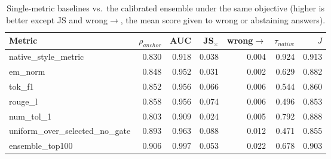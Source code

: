 \begin{table}[t]
\centering
\footnotesize
\caption{Single-metric baselines vs.\ the calibrated ensemble under the same objective (higher is better except JS and wrong$\to$, the mean score given to wrong or abstaining answers).}
\label{tab:baselines}

\begin{tabular}{lrrrrrr}
\toprule
Metric & $\rho_{anchor}$ & AUC & JS$_\times$ & wrong$\to$ & $\tau_{native}$ & $J$ \\
\midrule
native\_style\_metric & 0.830 & 0.918 & 0.038 & 0.004 & 0.924 & 0.913 \\
em\_norm & 0.848 & 0.952 & 0.031 & 0.002 & 0.629 & 0.882 \\
tok\_f1 & 0.852 & 0.956 & 0.066 & 0.006 & 0.544 & 0.860 \\
rouge\_l & 0.858 & 0.956 & 0.074 & 0.006 & 0.496 & 0.853 \\
num\_tol\_1 & 0.803 & 0.909 & 0.024 & 0.005 & 0.792 & 0.888 \\
uniform\_over\_selected\_no\_gate & 0.893 & 0.963 & 0.088 & 0.012 & 0.471 & 0.855 \\
ensemble\_top100 & 0.906 & 0.997 & 0.053 & 0.022 & 0.678 & 0.903 \\
\bottomrule
\end{tabular}

\end{table}